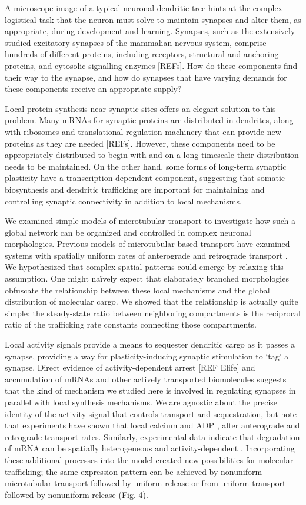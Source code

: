 \documentclass[fleqn,10pt]{wlpeerj}
\begin{document}
A microscope image of a typical neuronal dendritic tree hints at the complex logistical task that the neuron must solve to maintain synapses and alter them, as appropriate, during development and learning. Synapses, such as the extensively-studied excitatory synapses of the mammalian nervous system, comprise hundreds of different proteins, including receptors, structural and anchoring proteins, and cytosolic signalling enzymes [REFs]. How do these components find their way to the synapse, and how do synapses that have varying demands for these components receive an appropriate supply?

Local protein synthesis near synaptic sites offers an elegant solution to this problem. Many mRNAs for synaptic proteins are distributed in dendrites, along with ribosomes and translational regulation machinery that can provide new proteins as they are needed [REFs]. However, these components need to be appropriately distributed to begin with and on a long timescale their distribution needs to be maintained. On the other hand, some forms of long-term synaptic plasticity have a transcription-dependent component, suggesting that somatic biosynthesis and dendritic trafficking are important for maintaining and controlling synaptic connectivity in addition to local mechanisms.

We examined simple models of microtubular transport to investigate how such a global network can be organized and controlled in complex neuronal morphologies. Previous models of microtubular-based transport have examined systems with spatially uniform rates of anterograde and retrograde transport \citep{Smith_2001,Bressloff_2006}. We hypothesized that complex spatial patterns could emerge by relaxing this assumption. One might na\"ively expect that elaborately branched morphologies obfuscate the relationship between these local mechanisms and the global distribution of molecular cargo. We showed that the relationship is actually quite simple: the steady-state ratio between neighboring compartments is the reciprocal ratio of the trafficking rate constants connecting those compartments.

Local activity signals provide a means to sequester dendritic cargo as it passes a synapse, providing a way for plasticity-inducing synaptic stimulation to `tag' a synapse. Direct evidence of activity-dependent arrest [REF Elife] and accumulation \citep{Krichevsky_2001,Buxbaum_2014a} of mRNAs and other actively transported biomolecules suggests that the kind of mechanism we studied here is involved in regulating synapses in parallel with local synthesis mechanisms. We are agnostic about the precise identity of the activity signal that controls transport and sequestration, but note that experiments have shown that local calcium \citep{Wang_2009} and ADP \citep{Mironov_2007}, alter anterograde and retrograde transport rates. Similarly, experimental data indicate that degradation of mRNA can be spatially heterogeneous and activity-dependent \citep{Farris_2014}. Incorporating these additional processes into the model created new possibilities for molecular trafficking; the same expression pattern can be achieved by nonuniform microtubular transport followed by uniform release or from uniform transport followed by nonuniform release (Fig. 4).
\end{document}
